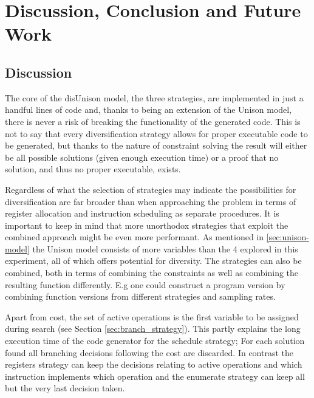 \chapter{Discussion, Conclusion and Future Work}
\label{chapter:discussion}

\section{Discussion}
\label{sec:discussion}

The core of the disUnison model, the three strategies, are implemented in just a handful
lines of code and, thanks to being an extension of the Unison model, there is never a risk
of breaking the functionality of the generated code. This is not to say that every
diversification strategy allows for proper executable code to be generated, but thanks to
the nature of constraint solving the result will either be all possible solutions
(given enough execution time) or a proof that no solution, and thus no proper executable,
exists.

Regardless of what the selection of strategies may indicate the possibilities for
diversification are far broader than when approaching the problem in terms of register
allocation and instruction scheduling as separate procedures. It is important to keep in
mind that more unorthodox strategies that exploit the combined approach might be even
more performant. As mentioned in \ref{sec:unison-model} the Unison model consists of more
variables than the 4 explored in this experiment, all of which offers potential for
diversity. The strategies can also be combined, both in terms of combining the constraints
as well as combining the resulting function differently. E.g one could construct a program
version by combining function versions from different strategies and sampling rates.

Apart from cost, the set of active operations is the first variable to be assigned during
search (see Section \ref{sec:branch_strategy}). This partly explains the long execution
time of the code generator for the schedule strategy; For each solution found all branching
decisions following the cost are discarded. In contrast the registers strategy can keep
the decisions relating to active operations and which instruction implements which
operation and the enumerate strategy can keep all but the very last decision taken.

